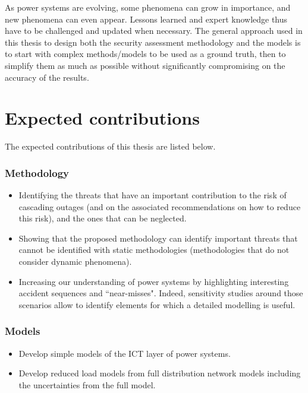 As power systems are evolving, some phenomena can grow in importance, and new phenomena can even appear. Lessons learned and expert knowledge thus have to be challenged and updated when necessary. The general approach used in this thesis to design both the security assessment methodology and the models is to start with complex methods/models to be used as a ground truth, then to simplify them as much as possible without significantly compromising on the accuracy of the results.%

\section{Expected contributions}

The expected contributions of this thesis are listed below.

\subsubsection{Methodology}
\begin{itemize}
    \item Identifying the threats that have an important contribution to the risk of cascading outages (and on the associated recommendations on how to reduce this risk), and the ones that can be neglected.
    \item Showing that the proposed methodology can identify important threats that cannot be identified with static methodologies (methodologies that do not consider dynamic phenomena).
    \item Increasing our understanding of power systems by highlighting interesting accident sequences and ``near-misses". Indeed, sensitivity studies around those scenarios allow to identify elements for which a detailed modelling is useful.
\end{itemize}

\subsubsection{Models}
\begin{itemize}
    \item Develop simple models of the ICT layer of power systems.
    \item Develop reduced load models from full distribution network models including the uncertainties from the full model.
\end{itemize}

